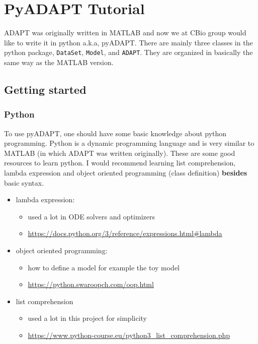 \hypertarget{pyadapt-tutorial}{%
\section{PyADAPT Tutorial}\label{pyadapt-tutorial}}

ADAPT was originally written in MATLAB and now we at CBio group would
like to write it in python a.k.a, pyADAPT. There are mainly three
classes in the python package, \texttt{DataSet}, \texttt{Model}, and
\texttt{ADAPT}. They are organized in basically the same way as the
MATLAB version.

\hypertarget{getting-started}{%
\subsection{Getting started}\label{getting-started}}

\hypertarget{python}{%
\subsubsection{Python}\label{python}}

To use pyADAPT, one should have some basic knowledge about python
programming. Python is a dynamic programming language and is very
similar to MATLAB (in which ADAPT was written originally). These are
some good resources to learn python. I would recommend learning list
comprehension, lambda expression and object oriented programming (class
definition) \textbf{besides} basic syntax.

\begin{itemize}
\tightlist
\item
  lambda expression:

  \begin{itemize}
  \tightlist
  \item
    used a lot in ODE solvers and optimizers
  \item
    \url{https://docs.python.org/3/reference/expressions.html\#lambda}
  \end{itemize}
\item
  object oriented programming:

  \begin{itemize}
  \tightlist
  \item
    how to define a model for example the toy model
  \item
    \url{https://python.swaroopch.com/oop.html}
  \end{itemize}
\item
  list comprehension

  \begin{itemize}
  \tightlist
  \item
    used a lot in this project for simplicity
  \item
    \url{https://www.python-course.eu/python3_list_comprehension.php}
  \end{itemize}
\end{itemize}

